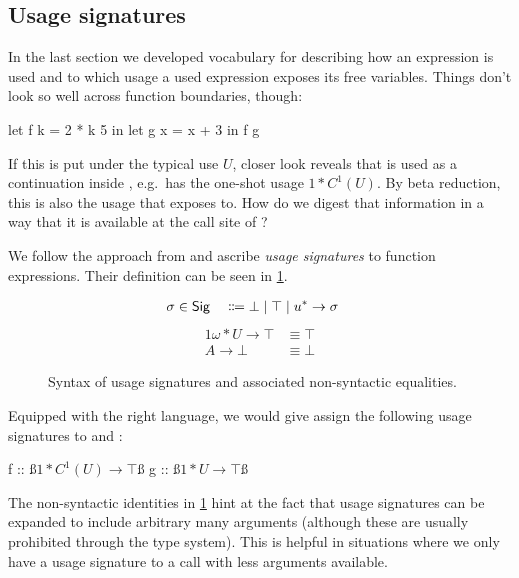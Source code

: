 
\subsection{Usage signatures}

In the last section we developed vocabulary for describing how an expression is used and to which usage a used expression exposes its free variables. Things don't look so well across function boundaries, though:

\begin{haskellcode}
let f k = 2 * k 5
in let g x = x + 3 
   in f g
\end{haskellcode}

If this is put under the typical use $U$, closer look reveals that  is used as a continuation inside , e.g.\ has the one-shot usage $1*C^1(U)$.
By beta reduction, this is also the usage that  exposes  to.
How do we digest that information in a way that it is available at the call site of ?

We follow the approach from \textcite{card} and ascribe \emph{usage signatures} to function expressions. Their definition can be seen in \cref{fig:sig}.

\begin{figure}
\begin{alignat*}{2}
\sigma &\in \text{\textsf{Sig}} &{} \Coloneqq {}& \bot \mid \top \mid u^* \to \sigma
\end{alignat*}
\begin{alignat*}{1}
\omega*U \to \top &\equiv \top \\
A \to \bot        &\equiv \bot
\end{alignat*}
\caption{Syntax of usage signatures and associated non-syntactic equalities.}
\label{fig:sig}
\end{figure}

Equipped with the right language, we would give assign the following usage signatures to  and :

\begin{haskellcode}
f :: ß$1*C^1(U) \to \top$ß
g :: ß$1*U \to \top$ß
\end{haskellcode}

The non-syntactic identities in \ref{fig:sig} hint at the fact that usage signatures can be expanded to include arbitrary many arguments (although these are usually prohibited through the type system). 
This is helpful in situations where we only have a usage signature to a call with less arguments available. 


